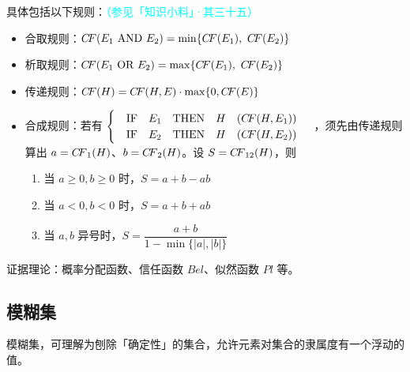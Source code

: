 \documentclass[UTF8]{ctexart}
\newcommand\AND{\  \textrm{AND}\ }
\newcommand\OR{\  \textrm{OR}\ }
\newcommand\IF{\quad\textrm{IF}\quad}
\newcommand\THEN{\quad\textrm{THEN}\quad}
\newcommand\CF{{C\hspace{-0.2em}F}}
\begin{document}
具体包括以下规则：\textcolor{cyan}{（参见「知识小料」·其三十五）}
\begin{itemize}[itemsep=0pt,parsep=0pt]
  \item 合取规则：$\CF(E_1\AND E_2) = \min\{\CF(E_1),\ \CF(E_2)\}$
  \item 析取规则：$\CF(E_1\OR E_2) = \max\{\CF(E_1),\ \CF(E_2)\}$
  \item 传递规则：$\CF(H) = \CF(H,E)\cdot \max\{0,\CF(E)\}$
  \item 合成规则：若有 $\begin{cases}
  \IF E_1 \THEN H\quad  (\CF(H,E_1))\\
  \IF E_2 \THEN H\quad  (\CF(H,E_2))
   \end{cases}$
    ，须先由传递规则算出 $a=\CF_1(H)$、$b=\CF_2(H)$。设 $S=\CF_{12}(H)$，则
      \begin{enumerate}[itemsep=2pt,parsep=0pt]
        \item 当 $a\geqslant 0,b\geqslant 0$ 时，$S = a+b-ab$
        \item 当 $a<0,b<0$ 时，$S = a+b+ab$
        \item 当 $a,b$ 异号时，$S = \dfrac{a+b}{1-\min\{|a|,|b|\}}$
      \end{enumerate}
\end{itemize}

证据理论：概率分配函数、信任函数 $Bel$、似然函数 $Pl$ 等。

\subsection{模糊集}
模糊集，可理解为刨除「确定性」的集合，允许元素对集合的隶属度有一个浮动的值。
\end{document}
